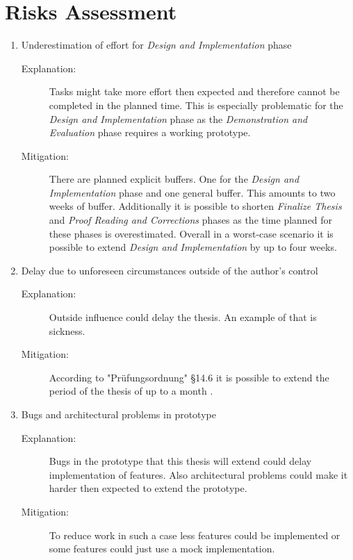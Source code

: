 \section{Risks Assessment}
\label{sec:Organisation:RiskAssessment}

\begin{enumerate}[label=Risk \arabic*:, align=left, leftmargin=*]
    \item Underestimation of effort for \emph{Design and Implementation} phase
        \begin{description}
            \item[Explanation:] Tasks might take more effort then expected and therefore cannot be completed in the planned time. This is especially problematic for the \emph{Design and Implementation} phase as the \emph{Demonstration and Evaluation} phase requires  a working prototype.
            \item[Mitigation:] There are planned explicit buffers. One for the \emph{Design and Implementation} phase and one general buffer. This amounts to two weeks of buffer. Additionally it is possible to shorten \emph{Finalize Thesis} and \emph{Proof Reading and Corrections} phases as the time planned for these phases is overestimated. Overall in a worst-case scenario it is possible to extend \emph{Design and Implementation} by up to four weeks.
        \end{description}
    \pagebreak[3]    
    \item Delay due to unforeseen circumstances outside of the author's control
        \begin{description}
            \item[Explanation:] Outside influence could delay the thesis. An example of that is sickness.
            \item[Mitigation:] According to "Prüfungsordnung" §14.6 it is possible to extend the period of the thesis of up to a month \cite[~ p. 724]{StudienUndPrufungsordnung2015}.
        \end{description}
    \pagebreak[3]
    \item Bugs and architectural problems in prototype
        \begin{description}
            \item[Explanation:] Bugs in the prototype that this thesis will extend could delay implementation of features. Also architectural problems could make it harder then expected to extend the prototype.
            \item[Mitigation:] To reduce work in such a case less features could be implemented or some features could just use a mock implementation.
        \end{description}
\end{enumerate}